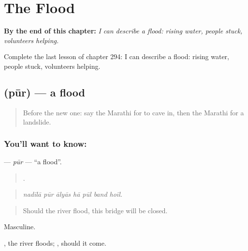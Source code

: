 
\chapter{The Flood}
\label{ch:mr-the-flood}

\begin{chapteropening}
\textbf{By the end of this chapter:} \emph{I can describe a flood: rising water, people stuck, volunteers helping.}

Complete the last lesson of chapter 294: I can describe a flood: rising water, people stuck, volunteers helping.
\end{chapteropening}

\section[\texorpdfstring{\mr{पूर} (pūr)}{पूर (pūr)}]{ (pūr) — a flood}

\label{lesson:MR-C294-pur}



\begin{quote}
Before the new one: say the Marathi for to cave in, then the Marathi for a landslide.
\end{quote}

\subsection*{You'll want to know: }
\textbf{} — \emph{pūr} — \textquotedblleft{}a flood\textquotedblright{}.

\begin{quote}
      .
\end{quote}

\begin{quote}
\emph{nadīlā pūr ālyās hā pūl band hoīl.}
\end{quote}

\begin{quote}
Should the river flood, this bridge will be closed.
\end{quote}

Masculine.

  , the river floods; , should it come.

